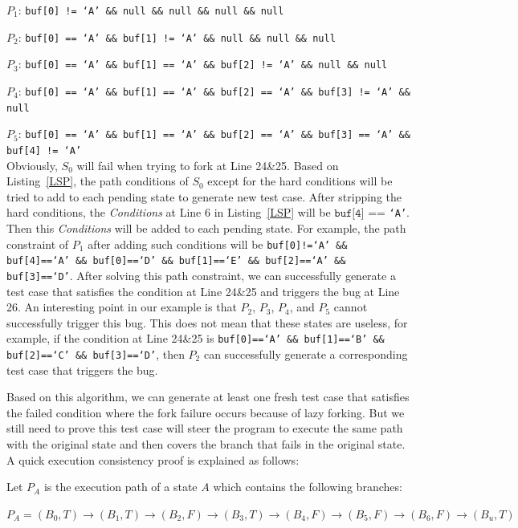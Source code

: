 $P_1$: \texttt{buf[0] != `A' \&\& null \&\& null  \&\& null  \&\& null}

$P_2$: \texttt{buf[0] == `A' \&\& buf[1] != `A' \&\& null \&\& null  \&\& null}

$P_3$: \texttt{buf[0] == `A' \&\& buf[1] == `A' \&\& buf[2] != `A' \&\& null  \&\& null}

$P_4$: \texttt{buf[0] == `A' \&\& buf[1] == `A' \&\& buf[2] == `A' \&\& buf[3] != `A'  \&\& null}

$P_5$: \texttt{buf[0] == `A' \&\& buf[1] == `A' \&\& buf[2] == `A' \&\& buf[3] == `A'  \&\& buf[4] != `A'}
\\

Obviously, $S_0$ will fail when trying to fork at Line 24\&25. Based on Listing~\ref{LSP}, the path conditions of $S_0$ except for the hard conditions will be tried to add to each pending state to generate new test case. After stripping the hard conditions, the \textit{Conditions} at Line 6 in Listing~\ref{LSP} will be $\texttt{buf[4]}$ == \texttt{`A'}. Then this \textit{Conditions} will be added to each pending state. For example, the path constraint of $P_1$ after adding such conditions will be \texttt{buf[0]!=`A' \&\& buf[4]==`A' \&\& buf[0]==`D' \&\& buf[1]==`E' \&\& buf[2]==`A' \&\& buf[3]==`D'}. After solving this path constraint, we can successfully generate a test case that satisfies the condition at Line 24\&25 and triggers the bug at Line 26. 
An interesting point in our example is that $P_2$, $P_3$, $P_4$, and $P_5$ cannot successfully trigger this bug. This does not mean that these states are useless, for example, if the condition at Line 24\&25 is \texttt{buf[0]==`A' \&\& buf[1]==`B' \&\& buf[2]==`C' \&\& buf[3]==`D'}, then $P_2$ can successfully generate a corresponding test case that triggers the bug.

Based on this algorithm, we can generate at least one fresh test case that satisfies the failed condition where the fork failure occurs because of lazy forking. But we still need to prove this test case will steer the program to execute the same path with the original state and then covers the branch that fails in the original state. A quick execution consistency proof is explained as follows:

Let $P_A$ is the execution path of a state $A$ which contains the following branches:
\begin{center}
$P_A = (B_0,T) \rightarrow (B_1,T) \rightarrow (B_2,F) \rightarrow (B_3,T)
\rightarrow (B_4,F) \rightarrow (B_5,F) \rightarrow (B_6,F) \rightarrow (B_u,T)$
\end{center}

